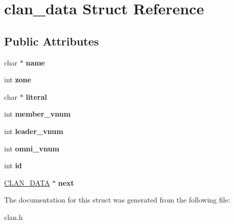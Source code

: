 \hypertarget{structclan__data}{\section{clan\-\_\-data Struct Reference}
\label{structclan__data}
}
\subsection*{Public Attributes}
\begin{DoxyCompactItemize}
\item 
\hypertarget{structclan__data_ab1a1db6e6b58d24b2aa0916a177ef706}{char $\ast$ {\bfseries name}}\label{structclan__data_ab1a1db6e6b58d24b2aa0916a177ef706}

\item 
\hypertarget{structclan__data_a776801bc7444a9e38f4f9b7b6e9dd43a}{int {\bfseries zone}}\label{structclan__data_a776801bc7444a9e38f4f9b7b6e9dd43a}

\item 
\hypertarget{structclan__data_a66471538c5978cdb076e6fe5eb7e2bfd}{char $\ast$ {\bfseries literal}}\label{structclan__data_a66471538c5978cdb076e6fe5eb7e2bfd}

\item 
\hypertarget{structclan__data_aad70d793cc6fab90c51c7882e39ba00b}{int {\bfseries member\-\_\-vnum}}\label{structclan__data_aad70d793cc6fab90c51c7882e39ba00b}

\item 
\hypertarget{structclan__data_af548b9a27c379c410a43808c846f959a}{int {\bfseries leader\-\_\-vnum}}\label{structclan__data_af548b9a27c379c410a43808c846f959a}

\item 
\hypertarget{structclan__data_a022cca2ea2c9cf355b2abf604c8f5db7}{int {\bfseries omni\-\_\-vnum}}\label{structclan__data_a022cca2ea2c9cf355b2abf604c8f5db7}

\item 
\hypertarget{structclan__data_a893475695eea4959052449783d2365cf}{int {\bfseries id}}\label{structclan__data_a893475695eea4959052449783d2365cf}

\item 
\hypertarget{structclan__data_a5e5e8b39a00ecd7634bf12da626dd0e0}{\hyperlink{structclan__data}{C\-L\-A\-N\-\_\-\-D\-A\-T\-A} $\ast$ {\bfseries next}}\label{structclan__data_a5e5e8b39a00ecd7634bf12da626dd0e0}

\end{DoxyCompactItemize}


The documentation for this struct was generated from the following file\-:\begin{DoxyCompactItemize}
\item 
clan.\-h\end{DoxyCompactItemize}
